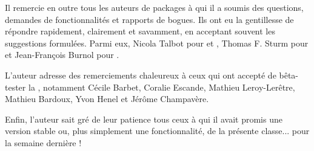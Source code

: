 Il remercie en outre tous les auteurs de packages à qui il a soumis  des questions, demandes de fonctionnalités et rapports
de bogues. Ils ont eu la gentillesse de répondre rapidement, clairement et
savamment, en acceptant souvent les suggestions formulées. Parmi eux, Nicola
Talbot pour  et , Thomas F. Sturm
pour  et Jean-François Burnol pour .

L'auteur adresse des remerciements chaleureux à ceux qui ont accepté de
bêta-tester la \yatCl{}, notamment Cécile Barbet, Coralie Escande, Mathieu
Leroy-Lerêtre, Mathieu Bardoux, Yvon Henel et Jérôme Champavère.

Enfin, l'auteur sait gré de leur patience tous ceux à qui il avait promis une
version stable ou, plus simplement une fonctionnalité, de la présente
classe... pour la semaine dernière !

